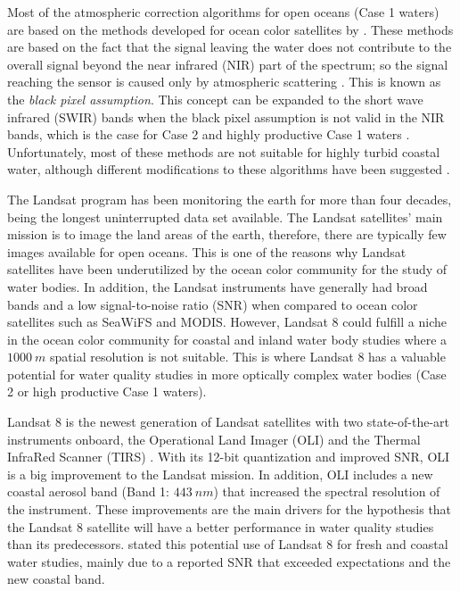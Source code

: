 \documentclass[onecolumn,3p,letterpaper,11pt]{elsarticle}
\begin{document}
Most of the atmospheric correction algorithms for open oceans (Case 1 waters) are based on the methods developed for ocean color satellites by \citet{Gordon:1997}. These methods are based on the fact that the signal leaving the water does not contribute to the overall signal beyond the near infrared (NIR) part of the spectrum; so the signal reaching the sensor is caused only by atmospheric scattering \citep{Gordon:1994}. This is known as the {\it black pixel assumption}. This concept can be expanded to the short wave infrared (SWIR) bands when the black pixel assumption is not valid in the NIR bands, which is the case for Case 2 and highly productive Case 1 waters \citep{Wang:2007}. Unfortunately, most of these methods are not suitable for highly turbid coastal water, although different modifications to these algorithms have been suggested \citep{Patt2003}.

The Landsat program has been monitoring the earth for more than four decades, being the longest uninterrupted data set available. The Landsat satellites' main mission is to image the land areas of the earth, therefore, there are typically few images available for open oceans. This is one of the reasons why Landsat satellites have been underutilized by the ocean color community for the study of water bodies. In addition, the Landsat instruments have generally had broad bands and a low signal-to-noise ratio (SNR) when compared to ocean color satellites such as SeaWiFS and MODIS. However, Landsat 8 could fulfill a niche in the ocean color community for coastal and inland water body studies where a $1000~m$ spatial resolution is not suitable. This is where Landsat 8 has a valuable potential for water quality studies in more optically complex water bodies (Case 2 or high productive Case 1 waters). 

Landsat 8 is the newest generation of Landsat satellites with two state-of-the-art instruments onboard, the Operational Land Imager (OLI) and the Thermal InfraRed Scanner (TIRS) \citep{Irons:2012}. With its 12-bit quantization and improved SNR, OLI is a big improvement to the Landsat mission. In addition, OLI includes a new coastal aerosol band (Band 1: $443~nm$) that increased the spectral resolution of the instrument. These improvements are the main drivers for the hypothesis that the Landsat 8 satellite will have a better performance in water quality studies than its predecessors. \citet{Roy:2014} stated this potential use of Landsat 8 for fresh and coastal water studies, mainly due to a reported SNR that exceeded expectations and the new coastal band.
\end{document}
